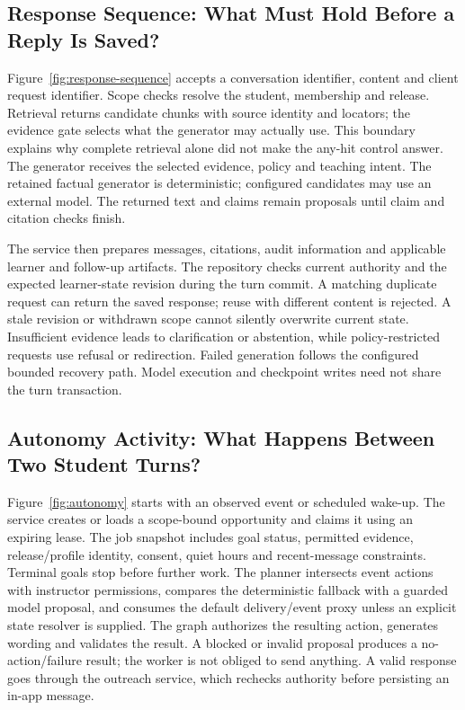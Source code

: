 \subsection{Response Sequence: What Must Hold Before a Reply Is Saved?}
Figure~\ref{fig:response-sequence} accepts a conversation identifier, content and
client request identifier. Scope checks resolve the student, membership and
release. Retrieval returns candidate chunks with source identity and locators;
the evidence gate selects what the generator may actually use. This boundary
explains why complete retrieval alone did not make the any-hit control answer.
The generator receives the selected evidence, policy and teaching intent. The
retained factual generator is deterministic; configured candidates may use an
external model. The returned text and claims remain proposals until claim and
citation checks finish.

The service then prepares messages, citations, audit information and applicable
learner and follow-up artifacts. The repository checks current authority and the
expected learner-state revision during the turn commit. A matching duplicate
request can return the saved response; reuse with different content is rejected.
A stale revision or withdrawn scope cannot silently overwrite current state.
Insufficient evidence leads to clarification or abstention, while policy-restricted
requests use refusal or redirection. Failed generation follows the configured
bounded recovery path. Model execution and checkpoint writes need not share the turn transaction.

\subsection{Autonomy Activity: What Happens Between Two Student Turns?}
Figure~\ref{fig:autonomy} starts with an observed event or scheduled wake-up.
The service creates or loads a scope-bound opportunity and claims it using an
expiring lease. The job snapshot includes goal status, permitted evidence,
release/profile identity, consent, quiet hours and recent-message constraints.
Terminal goals stop before further work. The planner intersects event actions
with instructor permissions, compares the deterministic fallback with a guarded
model proposal, and consumes the default delivery/event proxy unless an explicit
state resolver is supplied. The graph authorizes the resulting action,
generates wording and validates the result. A blocked or invalid proposal
produces a no-action/failure result; the worker is not obliged to send anything.
A valid response goes through the outreach service, which rechecks authority
before persisting an in-app message.

